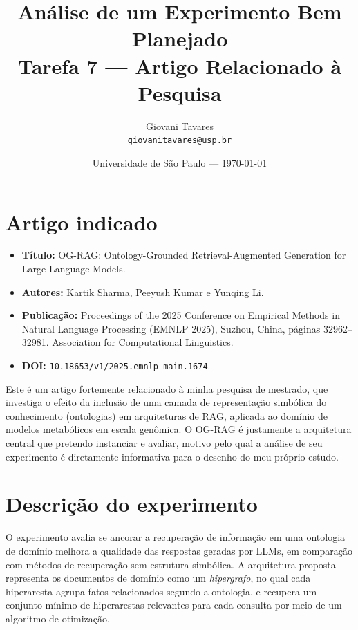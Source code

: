 \documentclass{article}
\title{Análise de um Experimento Bem Planejado \\ \large Tarefa 7 --- Artigo Relacionado à Pesquisa} %
\author{Giovani Tavares\\ \texttt{giovanitavares@usp.br}} %
\date{Universidade de São Paulo --- \today} %
\begin{document}
	
	\maketitle %
	
		
	\section{Artigo indicado}
	
	\begin{itemize}
		\item \textbf{Título:} OG-RAG: Ontology-Grounded Retrieval-Augmented Generation for Large Language Models.
		\item \textbf{Autores:} Kartik Sharma, Peeyush Kumar e Yunqing Li.
		\item \textbf{Publicação:} Proceedings of the 2025 Conference on Empirical Methods in Natural Language Processing (EMNLP 2025), Suzhou, China, páginas 32962--32981. Association for Computational Linguistics.
		\item \textbf{DOI:} \texttt{10.18653/v1/2025.emnlp-main.1674}.
	\end{itemize}
	
	\noindent Este é um artigo fortemente relacionado à minha pesquisa de mestrado,
	que investiga o efeito da inclusão de uma camada de representação simbólica do
	conhecimento (ontologias) em arquiteturas de RAG, aplicada ao domínio de modelos
	metabólicos em escala genômica. O OG-RAG é justamente a arquitetura central que
	pretendo instanciar e avaliar, motivo pelo qual a análise de seu experimento é
	diretamente informativa para o desenho do meu próprio estudo.
	
	\section{Descrição do experimento}
	
	O experimento avalia se ancorar a recuperação de informação em uma ontologia de
	domínio melhora a qualidade das respostas geradas por LLMs, em comparação com
	métodos de recuperação sem estrutura simbólica. A arquitetura proposta representa
	os documentos de domínio como um \emph{hipergrafo}, no qual cada hiperaresta
	agrupa fatos relacionados segundo a ontologia, e recupera um conjunto mínimo de
	hiperarestas relevantes para cada consulta por meio de um algoritmo de otimização.
	
\end{document}
